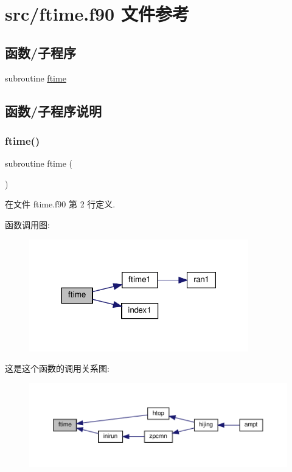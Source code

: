 \hypertarget{ftime_8f90}{}\section{src/ftime.f90 文件参考}
\label{ftime_8f90}
\subsection*{函数/子程序}
\begin{DoxyCompactItemize}
\item 
subroutine \mbox{\hyperlink{ftime_8f90_a7413e6736fd316adc8895dc748f144c5}{ftime}}
\end{DoxyCompactItemize}


\subsection{函数/子程序说明}
\mbox{\label{ftime_8f90_a7413e6736fd316adc8895dc748f144c5}} 
\subsubsection{\texorpdfstring{ftime()}{ftime()}}
{\footnotesize\ttfamily subroutine ftime (\begin{DoxyParamCaption}{ }\end{DoxyParamCaption})}



在文件 ftime.\+f90 第 2 行定义.

函数调用图\+:
\nopagebreak
\begin{figure}[H]
\begin{center}
\leavevmode
\includegraphics[width=270pt]{ftime_8f90_a7413e6736fd316adc8895dc748f144c5_cgraph}
\end{center}
\end{figure}
这是这个函数的调用关系图\+:
\nopagebreak
\begin{figure}[H]
\begin{center}
\leavevmode
\includegraphics[width=350pt]{ftime_8f90_a7413e6736fd316adc8895dc748f144c5_icgraph}
\end{center}
\end{figure}
